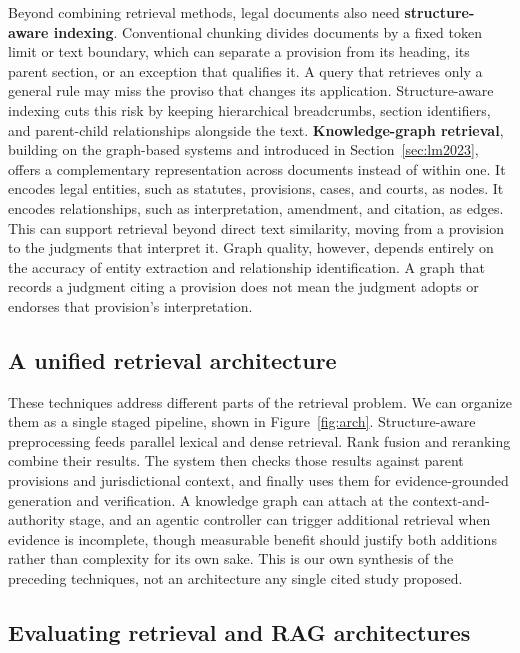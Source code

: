 Beyond combining retrieval methods, legal documents also need \textbf{structure-aware indexing}.
Conventional chunking divides documents by a fixed token limit or text boundary, which can separate
a provision from its heading, its parent section, or an exception that qualifies it. A query that
retrieves only a general rule may miss the proviso that changes its application. Structure-aware
indexing cuts this risk by keeping hierarchical breadcrumbs, section identifiers, and parent-child
relationships alongside the text. \textbf{Knowledge-graph retrieval}, building on the graph-based
systems \citet{sovrano2020} and \citet{zhu2022} introduced in Section~\ref{sec:lm2023}, offers a
complementary representation across documents instead of within one. It encodes legal entities,
such as statutes, provisions, cases, and courts, as nodes. It encodes relationships, such as
interpretation, amendment, and citation, as edges. This can support retrieval beyond direct text
similarity, moving from a provision to the judgments that interpret it. Graph quality, however,
depends entirely on the accuracy of entity extraction and relationship identification. A graph that
records a judgment citing a provision does not mean the judgment adopts or endorses that provision's
interpretation.

\subsection{A unified retrieval architecture}

These techniques address different parts of the retrieval problem. We can organize them as a single
staged pipeline, shown in Figure~\ref{fig:arch}. Structure-aware preprocessing feeds parallel
lexical and dense retrieval. Rank fusion and reranking combine their results. The system then checks
those results against parent provisions and jurisdictional context, and finally uses them for
evidence-grounded generation and verification. A knowledge graph can attach at the
context-and-authority stage, and an agentic controller can trigger additional retrieval when
evidence is incomplete, though measurable benefit should justify both additions rather than
complexity for its own sake. This is our own synthesis of the preceding techniques, not an
architecture any single cited study proposed.



\subsection{Evaluating retrieval and RAG architectures}

